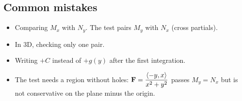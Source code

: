 \subsection*{Common mistakes}
\begin{itemize}
\item Comparing $M_x$ with $N_y$. The test pairs $M_y$ with $N_x$ (cross partials).
\item In 3D, checking only one pair.
\item Writing $+C$ instead of $+g(y)$ after the first integration.
\item The test needs a region without holes: $\mathbf{F}=\dfrac{\left\langle -y,x \right\rangle}{x^2+y^2}$ passes $M_y=N_x$ but is not
  conservative on the plane minus the origin.
\end{itemize}

